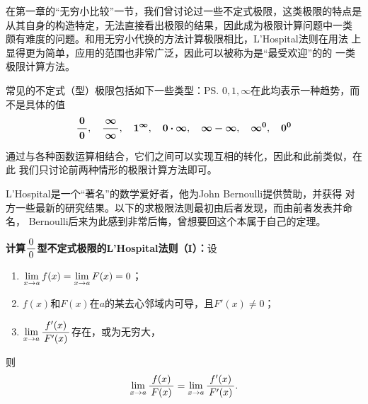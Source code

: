 在第一章的“无穷小比较”一节，我们曾讨论过一些不定式极限，这类极限的特点是
从其自身的构造特定，无法直接看出极限的结果，因此成为极限计算问题中一类
颇有难度的问题。和用无穷小代换的方法计算极限相比，L'Hospital法则在用法
上显得更为简单，应用的范围也非常广泛，因此可以被称为是“最受欢迎”的的
一类极限计算方法。

常见的不定式（型）极限包括如下一些类型：\ps{$0,1,\infty$在此均表示一种趋势，而不是具体的值}
$$\bm{\displaystyle\frac{\,{0}\,}{\,{0}\,}}, \quad \bm{\displaystyle\frac{\,{\infty}\,}{\,{\infty}\,}}, \quad
\bm{1^{\infty}}, \quad \bm{0\cdot\infty}, \quad
\bm{\infty-\infty}, \quad \bm{\infty^0}, \bm{\quad 0^0}$$
\begin{center}
\end{center}
通过与各种函数运算相结合，它们之间可以实现互相的转化，因此和此前类似，在此
我们只讨论前两种情形的极限计算方法即可。


L'Hospital是一个“著名”的数学爱好者，他为John Bernoulli提供赞助，并获得
对方一些最新的研究结果。以下的求极限法则最初由后者发现，而由前者发表并命名，
Bernoulli后来为此感到非常后悔，曾想要回这个本属于自己的定理。

\begin{thx}
	{\bf 计算$\displaystyle\frac{\,{0}\,}{\,{0}\,}$型不定式极限的L'Hospital法则（I）：}设
	\begin{enumerate}[(1)]
	  \item $\lim\limits_{x\to{a}}f(x)=\lim\limits_{x\to{a}}F(x)=0$；
	  \item $f(x)$和$F(x)$在$a$的某去心邻域内可导，且$F'(x)\ne0$；
	  \item $\lim\limits_{x\to{a}}\displaystyle\frac{\,{f'(x)}\,}{\,{F'(x)}\,}$存在，或为无穷大，
	\end{enumerate}
	则
	$$\lim\limits_{x\to{a}}\displaystyle\frac{\,{f(x)}\,}{\,{F(x)}\,}=\lim\limits_{x\to{a}}\displaystyle\frac{\,{f'(x)}\,}{\,{F'(x)}\,}.$$
\end{thx}

